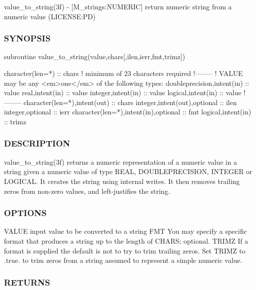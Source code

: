 value\+\_\+to\+\_\+string(3f) -\/ \mbox{[}M\+\_\+strings\+:N\+U\+M\+E\+R\+IC\mbox{]} return numeric string from a numeric value (L\+I\+C\+E\+N\+SE\+:PD) 

\subsubsection*{S\+Y\+N\+O\+P\+S\+IS}

\begin{DoxyVerb}subroutine value_to_string(value,chars[,ilen,ierr,fmt,trimz])

 character(len=*) :: chars  ! minimum of 23 characters required
 !--------
 ! VALUE may be any <em>one</em> of the following types:
 doubleprecision,intent(in)               :: value
 real,intent(in)                          :: value
 integer,intent(in)                       :: value
 logical,intent(in)                       :: value
 !--------
 character(len=*),intent(out)             :: chars
 integer,intent(out),optional             :: ilen
 integer,optional                         :: ierr
 character(len=*),intent(in),optional     :: fmt
 logical,intent(in)                       :: trimz
\end{DoxyVerb}
 \subsubsection*{D\+E\+S\+C\+R\+I\+P\+T\+I\+ON}

\begin{DoxyVerb}value_to_string(3f) returns a numeric representation of a numeric
value in a string given a numeric value of type REAL, DOUBLEPRECISION,
INTEGER or LOGICAL. It creates the string using internal writes. It
then removes trailing zeros from non-zero values, and left-justifies
the string.
\end{DoxyVerb}


\subsubsection*{O\+P\+T\+I\+O\+NS}

V\+A\+L\+UE input value to be converted to a string F\+MT You may specify a specific format that produces a string up to the length of C\+H\+A\+RS; optional. T\+R\+I\+MZ If a format is supplied the default is not to try to trim trailing zeros. Set T\+R\+I\+MZ to .true. to trim zeros from a string assumed to represent a simple numeric value.

\subsubsection*{R\+E\+T\+U\+R\+NS}

